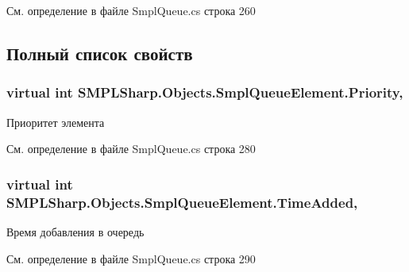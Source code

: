 См. определение в файле Smpl\-Queue.\-cs строка 260



\subsection{Полный список свойств}
\hypertarget{class_s_m_p_l_sharp_1_1_objects_1_1_smpl_queue_element_a90590a8e8518db73ed29b3f932f29e5e}{
\subsubsection[{Priority}]{\setlength{\rightskip}{0pt plus 5cm}virtual int S\-M\-P\-L\-Sharp.\-Objects.\-Smpl\-Queue\-Element.\-Priority\hspace{0.3cm}{\ttfamily [get]}, {\ttfamily [set]}}}\label{d3/d48/class_s_m_p_l_sharp_1_1_objects_1_1_smpl_queue_element_a90590a8e8518db73ed29b3f932f29e5e}


Приоритет элемента 



См. определение в файле Smpl\-Queue.\-cs строка 280

\hypertarget{class_s_m_p_l_sharp_1_1_objects_1_1_smpl_queue_element_a9bc2b0c2b6dce324521551f4333f9c5c}{
\subsubsection[{Time\-Added}]{\setlength{\rightskip}{0pt plus 5cm}virtual int S\-M\-P\-L\-Sharp.\-Objects.\-Smpl\-Queue\-Element.\-Time\-Added\hspace{0.3cm}{\ttfamily [get]}, {\ttfamily [set]}}}\label{d3/d48/class_s_m_p_l_sharp_1_1_objects_1_1_smpl_queue_element_a9bc2b0c2b6dce324521551f4333f9c5c}


Время добавления в очередь 



См. определение в файле Smpl\-Queue.\-cs строка 290

